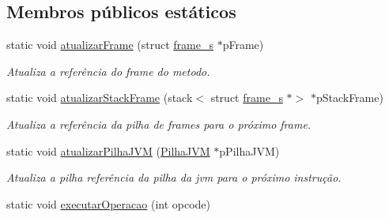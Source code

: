 \subsection*{Membros públicos estáticos}
\begin{DoxyCompactItemize}
\item 
static void \hyperlink{classOperations_a705efecd2a658615f2dfe777f0bd7032}{atualizar\+Frame} (struct \hyperlink{structframe__s}{frame\+\_\+s} $\ast$p\+Frame)
\begin{DoxyCompactList}\small\item\em Atualiza a referência do frame do metodo. \end{DoxyCompactList}\item 
static void \hyperlink{classOperations_a2564df73b5b237e5bda042909c4747b1}{atualizar\+Stack\+Frame} (stack$<$ struct \hyperlink{structframe__s}{frame\+\_\+s} $\ast$$>$ $\ast$p\+Stack\+Frame)
\begin{DoxyCompactList}\small\item\em Atualiza a referência da pilha de frames para o próximo frame. \end{DoxyCompactList}\item 
static void \hyperlink{classOperations_a5b31ab2923ed10b6ad3705f9954ed49e}{atualizar\+Pilha\+J\+VM} (\hyperlink{classPilhaJVM}{Pilha\+J\+VM} $\ast$p\+Pilha\+J\+VM)
\begin{DoxyCompactList}\small\item\em Atualiza a pilha referência da pilha da jvm para o próximo instrução. \end{DoxyCompactList}\item 
static void \hyperlink{classOperations_ab63307824c7d6412e0afb1d037b995f1}{executar\+Operacao} (int opcode)
\end{DoxyCompactItemize}
